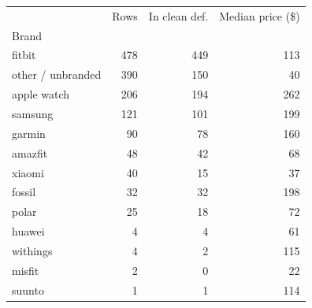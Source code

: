 \begin{tabular}{lrrr}
\toprule
 & Rows & In clean def. & Median price (\$) \\
Brand &  &  &  \\
\midrule
fitbit & 478 & 449 & 113 \\
other / unbranded & 390 & 150 & 40 \\
apple watch & 206 & 194 & 262 \\
samsung & 121 & 101 & 199 \\
garmin & 90 & 78 & 160 \\
amazfit & 48 & 42 & 68 \\
xiaomi & 40 & 15 & 37 \\
fossil & 32 & 32 & 198 \\
polar & 25 & 18 & 72 \\
huawei & 4 & 4 & 61 \\
withings & 4 & 2 & 115 \\
misfit & 2 & 0 & 22 \\
suunto & 1 & 1 & 114 \\
\bottomrule
\end{tabular}

